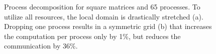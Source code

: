 \documentclass[sigplan,review,anonymous]{acmart}\settopmatter{printfolios=true,printccs=false,printacmref=false}
\begin{document}
\begin{figure}[!tbp]
	\centering
	\hfill
	\caption{Process decomposition for square matrices and 65 
		processes. To utilize all resources, the local domain 
		is 
		drastically stretched (a). Dropping one 
		process results in a symmetric grid (b) that 
		increases the computation per process only by 1\%, 
		but reduces 
		the communication by 36\%.}
	\label{fig:decompProblem}
\end{figure}
\end{document}
